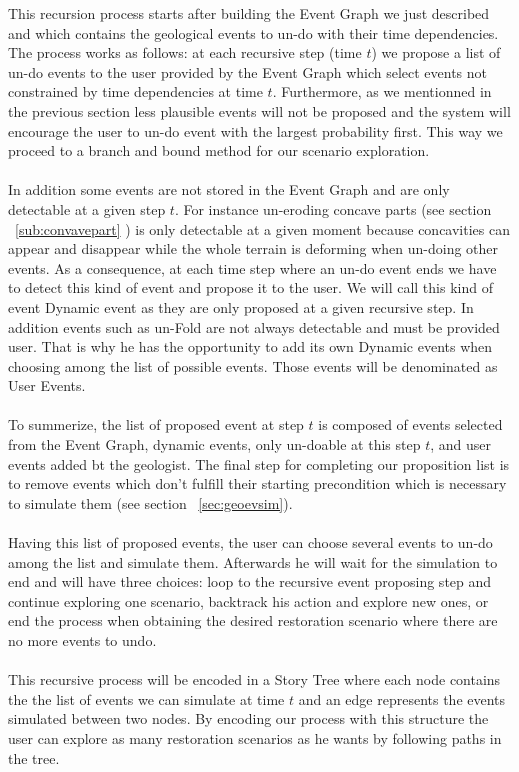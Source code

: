 \documentclass[12pt, a4paper]{report} %
\begin{document}
This recursion process starts after building the Event Graph we just described and which contains the geological events to un-do with their time dependencies. The process works as follows: at each recursive step (time $t$) we propose a list of un-do events to the user provided by the Event Graph which select events not constrained by time dependencies at time $t$. Furthermore, as we mentionned in the previous section less plausible events will not be proposed and the system will encourage the user to un-do event with the largest probability first. This way we proceed to a branch and bound method for our scenario exploration. \\\\
In addition some events are not stored in the Event Graph and are only detectable at a given step $t$. For instance un-eroding concave parts (see section ~\ref{sub:convavepart} ) is only detectable at a given moment because concavities can appear and disappear while the whole terrain is deforming when un-doing other events. As a consequence, at each time step where an un-do event ends we have to detect this kind of event and propose it to the user. We will call this kind of event Dynamic event as they are only proposed at a given recursive step. In addition events such as un-Fold are not always detectable and must be provided user. That is why he has the opportunity to add its own Dynamic events when choosing among the list of possible events. Those events will be denominated as User Events.\\\\
To summerize, the list of proposed event at step $t$ is composed of events selected from the Event Graph, dynamic events, only un-doable at this step $t$, and user events added bt the geologist. The final step for completing our proposition list is to remove events which don't fulfill their starting precondition which is necessary to simulate them (see section ~\ref{sec:geoevsim}).\\\\
Having this list of proposed events, the user can choose several events to un-do among the list and simulate them. Afterwards he will wait for the simulation to end and will have three choices: loop to the recursive event proposing step and continue exploring one scenario, backtrack his action and explore new ones, or end the process when obtaining the desired restoration scenario where there are no more events to undo.\\\\
This recursive process will be encoded in a Story Tree where each node contains the the list of events we can simulate at time $t$ and an edge represents the events simulated between two nodes. By encoding our process with this structure the user can explore as many restoration scenarios as he wants by following paths in the tree.
\end{document}
